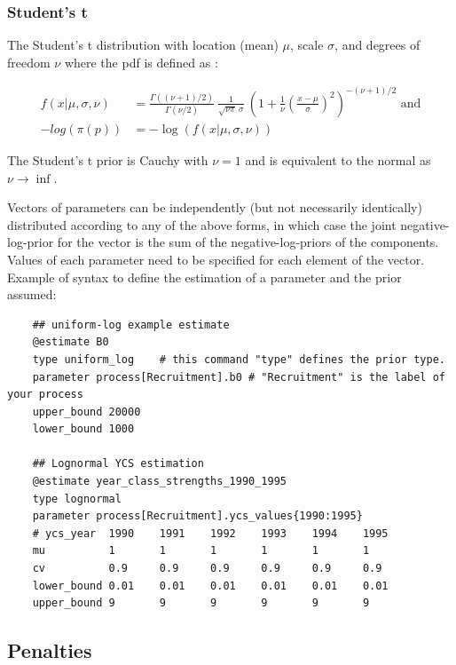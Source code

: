 \subsubsection{Student's t}\label{sec:Prior-Studentst}

The Student's t distribution with location (mean) $\mu$, scale $\sigma$, and degrees of freedom $\nu$ where the pdf is defined as \citep{STAN}:

\begin{equation}
	\begin{aligned}
f(x | \mu, \sigma, \nu) &= \frac{\Gamma\left((\nu + 1)/2\right)} {\Gamma(\nu/2)} \ \frac{1}{\sqrt{\nu \pi} \ \sigma} \ \left( 1 + \frac{1}{\nu} \left(\frac{x - \mu}{\sigma}\right)^2 \right)^{-(\nu + 1)/2} \text{ and} \\
- log \left(\pi \left( p \right) \right) &= -\log \left( f(x | \mu, \sigma, \nu) \right)
	\end{aligned}
\end{equation}

The Student's t prior is Cauchy with $\nu = 1$ and is equivalent to the normal as $\nu \rightarrow \inf$.

Vectors of parameters can be independently (but not necessarily identically) distributed according to any of the above forms, in which case the joint negative-log-prior for the vector is the sum of the negative-log-priors of the components. Values of each parameter need to be specified for each element of the vector. Example of syntax to define the estimation of a parameter and the prior assumed:

{\small{\begin{verbatim}
	## uniform-log example estimate
	@estimate B0
	type uniform_log	# this command "type" defines the prior type.
	parameter process[Recruitment].b0 # "Recruitment" is the label of your process
	upper_bound 20000
	lower_bound 1000

	## Lognormal YCS estimation
	@estimate year_class_strengths_1990_1995
	type lognormal
	parameter process[Recruitment].ycs_values{1990:1995}
	# ycs_year  1990	1991	1992	1993	1994	1995
	mu   		1   	1   	1   	1   	1   	1
	cv 			0.9 	0.9 	0.9 	0.9 	0.9 	0.9
	lower_bound 0.01	0.01	0.01	0.01	0.01	0.01
	upper_bound 9		9		9		9		9		9
\end{verbatim}}}

\subsection{Penalties}\label{sec:Penalty}\label{sec:Penalty-Process}

